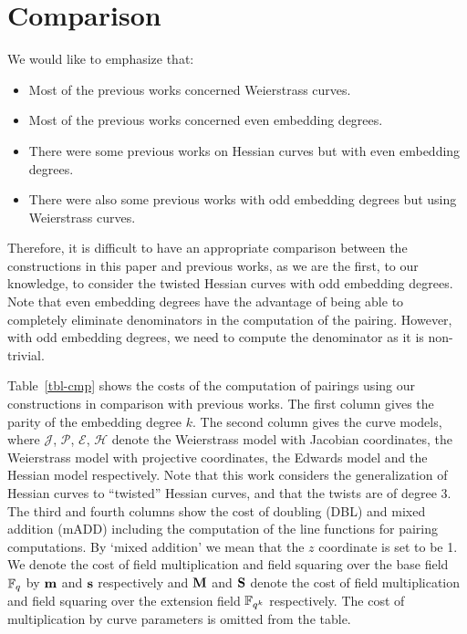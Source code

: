 \section{Comparison}
\label{sec:cmp}

We would like to emphasize that:
\begin{itemize}
\item	Most of the previous works concerned Weierstrass curves.
\item	Most of the previous works concerned even embedding degrees.
\item	There were some previous works on Hessian curves but with even embedding degrees.
\item	There were also some previous works with odd embedding degrees but using Weierstrass curves.
\end{itemize}
Therefore, it is difficult to have an appropriate comparison between the constructions in this paper and previous works,
as we are the first, to our knowledge, to consider the twisted Hessian curves with odd embedding degrees.
Note that even embedding degrees have the advantage of being able to completely eliminate denominators in the computation of the pairing.
However, with odd embedding degrees, we need to compute the denominator as it is non-trivial.

Table~\ref{tbl-cmp} shows the costs of the computation of pairings using our constructions in comparison with previous works.
The first column gives the parity of the embedding degree $k$.
The second column gives the curve models, where 
$\mathcal{J}$, $\mathcal{P}$, $\mathcal{E}$, $\mathcal{H}$ denote the
Weierstrass model with Jacobian coordinates, the
Weierstrass model with projective coordinates,
the Edwards model and the
Hessian model respectively.
Note that this work considers the generalization of Hessian curves to ``twisted'' Hessian curves, and that the twists are of degree 3.
The third and fourth columns show the cost of doubling (DBL) and mixed addition (mADD) including the computation of the line functions for pairing computations.
By `mixed addition' we mean that the $z$ coordinate is set to be 1.
We denote the cost of field multiplication and field squaring over the base field $\mathbb{F}_{q}$ by $\textbf{m}$ and $\textbf{s}$ respectively and $\textbf{M}$ and $\textbf{S}$ denote the cost of field multiplication and field squaring over the extension field $\mathbb{F}_{q^k}$ respectively.
The cost of multiplication by curve parameters is omitted from the table.

